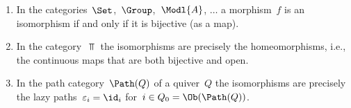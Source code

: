 \begin{example}
  \leavevmode
  \begin{enumerate}
    \item
      In the categories~$\Set$,~$\Group$,~$\Modl{A}$, $\dots$ a morphism~$f$ is an isomorphism if and only if it is bijective (as a  map).
    \item
      In the category~$\Top$ the isomorphisms are precisely the homeomorphisms, i.e., the continuous maps that are both bijective and open.
    \item
      In the path category~$\Path(Q)$ of a quiver~$Q$ the isomorphisms are precisely the lazy paths~$\varepsilon_i = \id_i$ for~$i \in Q_0 = \Ob(\Path(Q))$.
  \end{enumerate}
\end{example}




